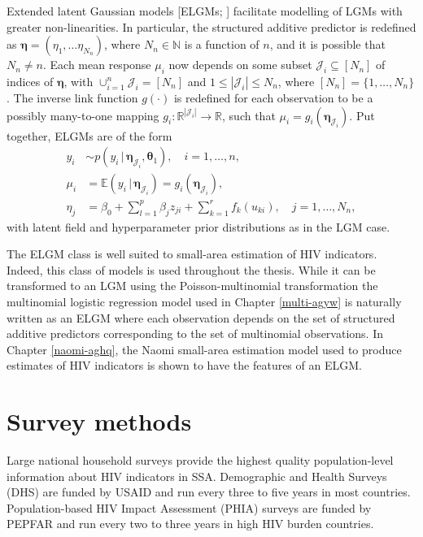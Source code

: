 \documentclass[a4paper, nobind]{templates/ociamthesis}
\newcommand{\btheta}{\bm{\theta}}
\newcommand{\bmeta}{\bm{\eta}}
\begin{document}
Extended latent Gaussian models {[}ELGMs; \textcite{stringer2021fast}{]} facilitate modelling of LGMs with greater non-linearities.
In particular, the structured additive predictor is redefined as \(\bmeta = (\eta_1, \ldots \eta_{N_n})\), where \(N_n \in \mathbb{N}\) is a function of \(n\), and it is possible that \(N_n \neq n\).
Each mean response \(\mu_i\) now depends on some subset \(\mathcal{J}_i \subseteq [N_n]\) of indices of \(\bmeta\), with \(\cup_{i = 1}^n \mathcal{J}_i = [N_n]\) and \(1 \leq |\mathcal{J}_i| \leq N_n\), where \([N_n] = \{1, \ldots, N_n\}\).
The inverse link function \(g(\cdot)\) is redefined for each observation to be a possibly many-to-one mapping \(g_i: \mathbb{R}^{|\mathcal{J}_i|} \to \mathbb{R}\), such that \(\mu_i = g_i(\bmeta_{\mathcal{J}_i})\).
Put together, ELGMs are of the form
\begin{align*}
y_i &\sim p(y_i \, | \, \bmeta_{\mathcal{J}_i}, \btheta_1), \quad i = 1, \ldots, n, \\
\mu_i &= \mathbb{E}(y_i \, | \, \bmeta_{\mathcal{J}_i}) = g_i(\bmeta_{\mathcal{J}_i}), \\
\eta_j &= \beta_0 + \sum_{l = 1}^{p} \beta_j z_{ji} + \sum_{k = 1}^{r} f_k(u_{ki}), \quad j = 1, \ldots, N_n,
\end{align*}
with latent field and hyperparameter prior distributions as in the LGM case.

The ELGM class is well suited to small-area estimation of HIV indicators.
Indeed, this class of models is used throughout the thesis.
While it can be transformed to an LGM using the Poisson-multinomial transformation \autocite{baker1994multinomial} the multinomial logistic regression model used in Chapter \ref{multi-agyw} is naturally written as an ELGM where each observation depends on the set of structured additive predictors corresponding to the set of multinomial observations.
In Chapter \ref{naomi-aghq}, the Naomi small-area estimation model used to produce estimates of HIV indicators is shown to have the features of an ELGM.

\hypertarget{survey}{%
\section{Survey methods}\label{survey}}

Large national household surveys provide the highest quality population-level information about HIV indicators in SSA.
Demographic and Health Surveys (DHS) are funded by USAID and run every three to five years in most countries.
Population-based HIV Impact Assessment (PHIA) surveys are funded by PEPFAR and run every two to three years in high HIV burden countries.
\end{document}
